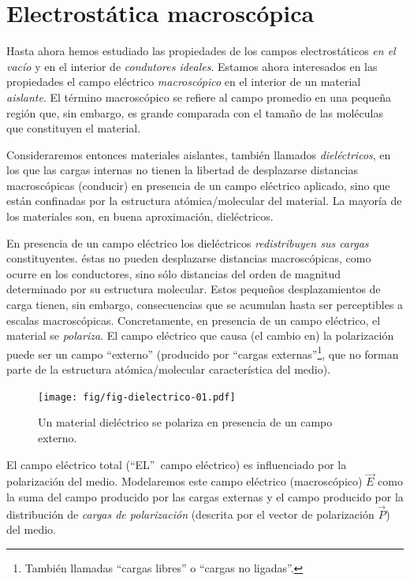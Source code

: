\newpage

\section{Electrostática macroscópica}
Hasta ahora hemos estudiado las propiedades de los campos
electrostáticos \textit{en el vacío} y en el interior de \textit{condutores ideales}.
Estamos ahora interesados en las propiedades el campo eléctrico \textit{macroscópico} en el interior de un material \textit{aislante}. El término macroscópico se refiere al campo promedio en una peque\~na región que, sin embargo, es grande comparada con el tama\~no de las moléculas que constituyen el material.

Consideraremos entonces materiales aislantes, también llamados \textit{dieléctricos}, en los que las cargas internas no tienen la
libertad de desplazarse distancias macroscópicas (conducir) en presencia de un
campo eléctrico aplicado, sino que están confinadas por la estructura
atómica/molecular del material. La mayoría de los materiales son, en buena
aproximación, dieléctricos.

En presencia de un campo eléctrico los dieléctricos \textit{redistribuyen sus cargas} constituyentes. éstas no pueden desplazarse distancias macroscópicas,
como ocurre en los conductores, sino sólo distancias del orden de magnitud determinado por su estructura molecular.
Estos peque\~nos desplazamientos de carga tienen, sin embargo, consecuencias
que se acumulan hasta ser perceptibles a escalas macroscópicas.
Concretamente, en presencia de un campo eléctrico, el material
se \textit{polariza}.
El campo eléctrico que causa (el cambio en) la polarización puede ser un campo ``externo'' (producido por ``cargas externas''\footnote{También llamadas ``cargas libres'' o ``cargas no ligadas''.}, que no forman parte
de la estructura atómica/molecular característica del medio).
\begin{figure}[!h]
\centerline{\texttt{[image: fig/fig-dielectrico-01.pdf]}}
\caption{Un material dieléctrico se polariza en presencia de un campo externo.}
\label{diel01}
\end{figure}

El campo eléctrico total (``EL''\, campo eléctrico) es influenciado por
la polarización del medio. Modelaremos este campo eléctrico
(macroscópico) $\vec{E}$ como la suma del campo
producido por las cargas externas y el campo producido por la distribución
de \textit{cargas de polarización} (descrita por el vector de polarización $\vec{P}$) del medio.

